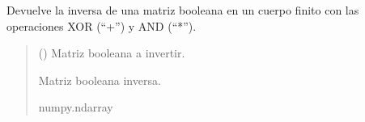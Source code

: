 \documentclass[letterpaper,10pt,english]{sphinxmanual}
\begin{document}
\begin{fulllineitems}
\label{\detokenize{utils.bool:utils.bool.invert_matrix_gf2}}
\pysigstartsignatures
{}
\pysigstopsignatures
\sphinxAtStartPar
Devuelve la inversa de una matriz booleana en un cuerpo finito con las operaciones XOR (“+”) y AND (“*”).
\begin{quote}\begin{description}
\sphinxAtStartPar
{} () \textendash{} Matriz booleana a invertir.

\sphinxAtStartPar
Matriz booleana inversa.

\sphinxAtStartPar
numpy.ndarray

\end{description}\end{quote}

\end{fulllineitems}

\end{document}
